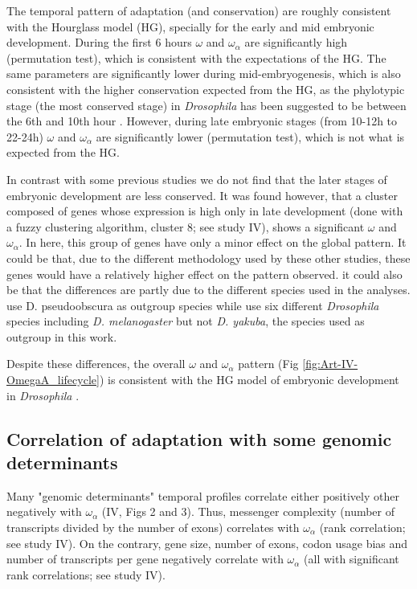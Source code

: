 The temporal pattern of adaptation (and conservation) are roughly consistent with the Hourglass model (HG), specially for the early and mid embryonic development.
During the first 6 hours $\omega$ and $\omega_{\alpha}$ are significantly high (permutation test), which is consistent with the expectations of the HG.
The same parameters are significantly lower during mid-embryogenesis, which is also consistent with the higher conservation expected from the HG, as the phylotypic stage (the most conserved stage) in \textit{Drosophila} has been suggested to be between the 6th and 10th hour \citep{Drost2015}.
However, during late embryonic stages (from 10-12h to 22-24h) $\omega$ and $\omega_{\alpha}$ are significantly lower (permutation test), which is not what is expected from the HG.

In contrast with some previous studies \citep{Davis2005,Kalinka2010} we do not find that the later stages of embryonic development are less conserved. 
It was found however, that a cluster composed of genes whose expression is high only in late development (done with a fuzzy clustering algorithm, cluster 8; see study IV), shows a significant $\omega$ and $\omega_{\alpha}$. In here, this group of genes have only a minor effect on the global pattern.
It could be that, due to the different methodology used by these other studies, these genes would have a relatively higher effect on the pattern observed. it could also be that the differences are partly due to the different species used in the analyses.\citet{Davis2005} use D. pseudoobscura as outgroup species while \citet{Kalinka2010} use six different \textit{Drosophila} species including \textit{D. melanogaster} but not \textit{D. yakuba}, the species used as outgroup in this work.

Despite these differences, the overall $\omega$ and $\omega_{\alpha}$ pattern (Fig \ref{fig:Art-IV-OmegaA_lifecycle}) is consistent with the HG model of embryonic development in \textit{Drosophila} \citep{Kalinka2010}.


\subsection{Correlation of adaptation with some genomic determinants}
Many "genomic determinants" temporal profiles correlate either positively other negatively with $\omega_{\alpha}$ (IV, Figs 2 and 3). 
%
Thus, messenger complexity (number of transcripts divided by the number of exons) correlates with $\omega_{\alpha}$ (rank correlation; see study IV). On the contrary, gene size, number of exons, codon usage bias and number of transcripts per gene negatively correlate with $\omega_{\alpha}$ (all with significant rank correlations; see study IV). 

